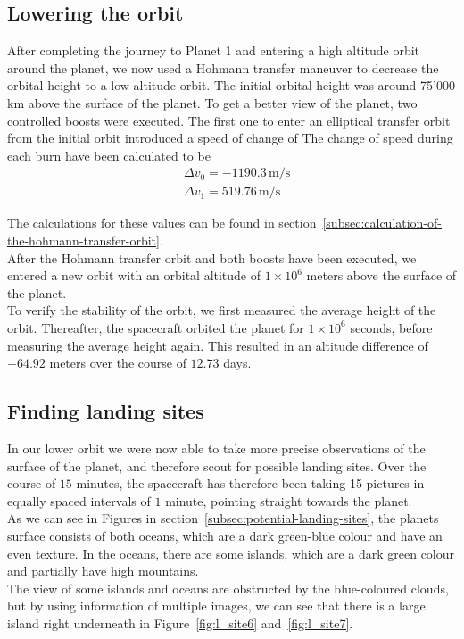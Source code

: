 \documentclass[reprint,english,notitlepage]{revtex4-2}
\begin{document}
\subsection{Lowering the orbit}\label{subsec:lowering-the-orbit}
    After completing the journey to Planet 1 and entering a high altitude orbit around the planet, we now used a Hohmann transfer maneuver to decrease the orbital height to a low-altitude orbit.
    The initial orbital height was around 75'000 km above the surface of the planet.
    To get a better view of the planet, two controlled boosts were executed.
    The first one to enter an elliptical transfer orbit from the initial orbit introduced a speed of change of
    The change of speed during each burn have been calculated to be
    \begin{align*}
        &\Delta v_0 = -1190.3 \,\text{m/s}\\
        &\Delta v_1 = 519.76 \,\text{m/s}
    \end{align*}

    The calculations for these values can be found in section~\ref{subsec:calculation-of-the-hohmann-transfer-orbit}.\\

    After the Hohmann transfer orbit and both boosts have been executed, we entered a new orbit with an orbital altitude of $1 \times 10^6$ meters above the surface of the planet.\\

    To verify the stability of the orbit, we first measured the average height of the orbit.
    Thereafter, the spacecraft orbited the planet for $1 \times 10^6$ seconds, before measuring the average height again.
    This resulted in an altitude difference of $-64.92$ meters over the course of $12.73$ days.


\subsection{Finding landing sites}\label{subsec:finding-landing-sites}
    In our lower orbit we were now able to take more precise observations of the surface of the planet, and therefore scout for possible landing sites.
    Over the course of $15$ minutes, the spacecraft has therefore been taking 15 pictures in equally spaced intervals of $1$ minute, pointing straight towards the planet.\\
    As we can see in Figures in section~\ref{subsec:potential-landing-sites}, the planets surface consists of both oceans, which are a dark green-blue colour and have an even texture.
    In the oceans, there are some islands, which are a dark green colour and partially have high mountains.\\
    The view of some islands and oceans are obstructed by the blue-coloured clouds, but by using information of multiple images, we can see that there is a large island right underneath in Figure~\ref{fig:l_site6} and~\ref{fig:l_site7}.\\
\end{document}

